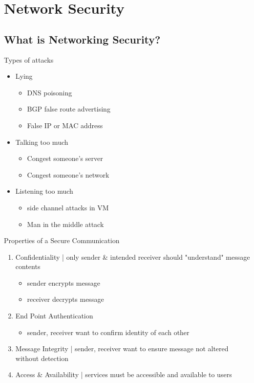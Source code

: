 \documentclass{article}
\begin{document}
\setcounter{section}{7}
\section{Network Security}

\subsection{What is Networking Security?}

Types of attacks
\begin{itemize}
	\item Lying
	\begin{itemize}
		\item DNS poisoning
		\item BGP false route advertising
		\item False IP or MAC address
	\end{itemize}
	\item Talking too much
	\begin{itemize}
		\item Congest someone's server
		\item Congest someone's network
	\end{itemize}
	\item Listening too much
	\begin{itemize}
		\item side channel attacks in VM
		\item Man in the middle attack
	\end{itemize}
\end{itemize}

\noindent Properties of a Secure Communication
\begin{enumerate}
	\item Confidentiality | only sender \& intended receiver should "understand" message contents
	\begin{itemize}
		\item sender encrypts message
		\item receiver decrypts message
	\end{itemize}
	
	\item End Point Authentication
	\begin{itemize}
		\item sender, receiver want to confirm identity of each other
	\end{itemize}
	
	\item Message Integrity | sender, receiver want to ensure message not altered without detection
	
	\item Access \& Availability | services must be accessible and available to users
\end{enumerate}
\end{document}
